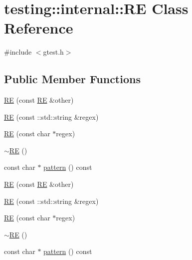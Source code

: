 \hypertarget{classtesting_1_1internal_1_1_r_e}{\section{testing\-:\-:internal\-:\-:R\-E Class Reference}
\label{classtesting_1_1internal_1_1_r_e}
}


{\ttfamily \#include $<$gtest.\-h$>$}

\subsection*{Public Member Functions}
\begin{DoxyCompactItemize}
\item 
\hyperlink{classtesting_1_1internal_1_1_r_e_ab215dbc2565fce641e1746ca43e9d68a}{R\-E} (const \hyperlink{classtesting_1_1internal_1_1_r_e}{R\-E} \&other)
\item 
\hyperlink{classtesting_1_1internal_1_1_r_e_a8840bd639642f3d4769a94a68ce463c2}{R\-E} (const \-::std\-::string \&regex)
\item 
\hyperlink{classtesting_1_1internal_1_1_r_e_a908ea936a5b7a14479a1b292a7189ca6}{R\-E} (const char $\ast$regex)
\item 
\hyperlink{classtesting_1_1internal_1_1_r_e_af3ad18e6c0b433f3d85ed23eda8119f3}{$\sim$\-R\-E} ()
\item 
const char $\ast$ \hyperlink{classtesting_1_1internal_1_1_r_e_acb67d77f53e73af81cce6dcd663c94df}{pattern} () const 
\item 
\hyperlink{classtesting_1_1internal_1_1_r_e_ab215dbc2565fce641e1746ca43e9d68a}{R\-E} (const \hyperlink{classtesting_1_1internal_1_1_r_e}{R\-E} \&other)
\item 
\hyperlink{classtesting_1_1internal_1_1_r_e_a8840bd639642f3d4769a94a68ce463c2}{R\-E} (const \-::std\-::string \&regex)
\item 
\hyperlink{classtesting_1_1internal_1_1_r_e_a908ea936a5b7a14479a1b292a7189ca6}{R\-E} (const char $\ast$regex)
\item 
\hyperlink{classtesting_1_1internal_1_1_r_e_af3ad18e6c0b433f3d85ed23eda8119f3}{$\sim$\-R\-E} ()
\item 
const char $\ast$ \hyperlink{classtesting_1_1internal_1_1_r_e_acb67d77f53e73af81cce6dcd663c94df}{pattern} () const 
\end{DoxyCompactItemize}
